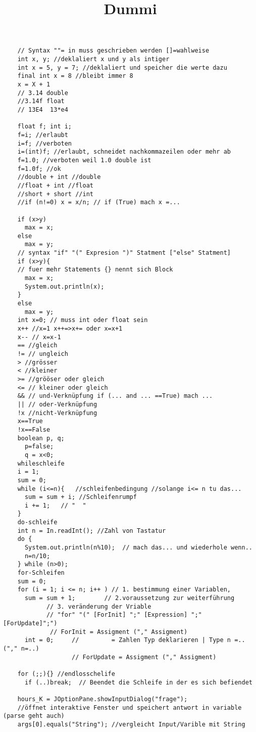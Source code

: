 \documentclass[a4paper,12pt]{article}
\title{Dummi}
\begin{document}
\setlength{\parindent}{0pt}
\setlength{\parskip}{30pt}
\setlength{\baselineskip}{20pt}


    \begin{lstlisting}
    // Syntax ""= in muss geschrieben werden []=wahlweise
    int x, y; //deklaliert x und y als intiger
    int x = 5, y = 7; //deklaliert und speicher die werte dazu
    final int x = 8 //bleibt immer 8
    x = X + 1
    // 3.14 double
    //3.14f float
    // 13E4  13*e4

    float f; int i;
    f=i; //erlaubt
    i=f; //verboten
    i=(int)f; //erlaubt, schneidet nachkommazeilen oder mehr ab
    f=1.0; //verboten weil 1.0 double ist
    f=1.0f; //ok
    //double + int //double
    //float + int //float
    //short + short //int
    //if (n!=0) x = x/n; // if (True) mach x =...

    if (x>y)
      max = x;
    else 
      max = y;
    // syntax "if" "(" Expresion ")" Statment ["else" Statment]
    if (x>y){    
    // fuer mehr Statements {} nennt sich Block
      max = x;
      System.out.println(x);
    }
    else 
      max = y; 
    int x=0; // muss int oder float sein
    x++ //x=1 x++=>x+= oder x=x+1
    x-- // x=x-1 
    == //gleich
    != // ungleich
    > //grösser
    < //kleiner
    >= //grööser oder gleich
    <= // kleiner oder gleich
    && // und-Verknüpfung if (... and ... ==True) mach ...
    || // oder-Verknüpfung
    !x //nicht-Verknüpfung
    x==True 
    !x==False
    boolean p, q;
      p=false;
      q = x<0;
    whileschleife
    i = 1;
    sum = 0;
    while (i<=n){   //schleifenbedingung //solange i<= n tu das...
      sum = sum + i; //Schleifenrumpf
      i += 1;   // "  "
    }
    do-schleife
    int n = In.readInt(); //Zahl von Tastatur
    do {
      System.out.println(n%10);  // mach das... und wiederhole wenn..
      n=n/10;
    } while (n>0);
    for-Schleifen
    sum = 0;
    for (i = 1; i <= n; i++ ) // 1. bestimmung einer Variablen, 
      sum = sum + 1;		// 2.voraussetzung zur weiterführung 
            // 3. veränderung der Vriable
            // "for" "(" [ForInit] ";" [Expression] ";" [ForUpdate]";")
             // ForInit = Assigment ("," Assigment)
      int = 0;	   //         = Zahlen Typ deklarieren | Type n =.. ("," n=..)
                   // ForUpdate = Assigment ("," Assigment)
           
    for (;;){} //endlosschelife
      if (..)break;  // Beendet die Schleife in der es sich befiendet

    hours_K = JOptionPane.showInputDialog("frage"); 
    //öffnet interaktive Fenster und speichert antwort in variable (parse geht auch)
    args[0].equals("String"); //vergleicht Input/Varible mit String


\end{lstlisting}
\end{document}
